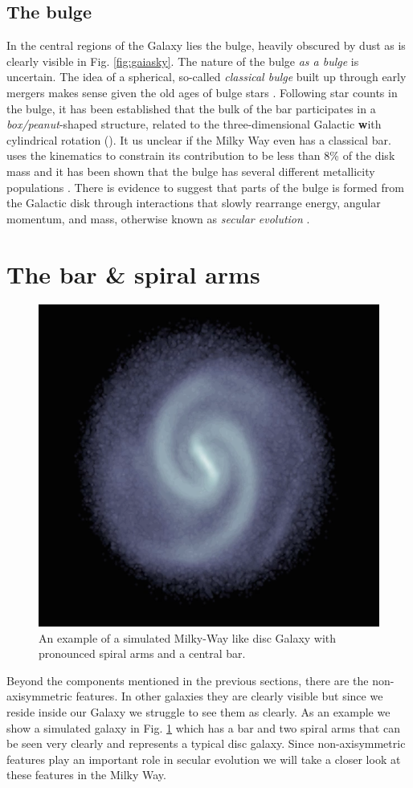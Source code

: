 \subsection{The bulge}\label{subsec:components-bulge}
In the central regions of the Galaxy lies the bulge, heavily obscured by dust as is clearly visible in Fig. \ref{fig:gaiasky}. The nature of the bulge \textit{as a bulge} is uncertain. The idea of a spherical, so-called \textit{classical bulge} built up through early mergers makes sense given the old ages of bulge stars \citep{clarkson:08}. Following star counts in the bulge, it has been established that the bulk of the bar participates in a \textit{box/peanut}-shaped structure, related to the three-dimensional Galactic \textbf with cylindrical rotation (\citealt{wegg:13, ness:13b}). It us unclear if the Milky Way even has a classical bar. \cite{shen:10} uses the kinematics to constrain its contribution to be less than 8\% of the disk mass and it has been shown that the bulge has several different metallicity populations \citep{ness:13a}. There is evidence to suggest that parts of the bulge is formed from the Galactic disk \citep{dimatteo:19} through interactions that slowly rearrange energy, angular momentum, and mass, otherwise known as \textit{secular evolution} \citep{kormendy:13}.

\section{The bar \& spiral arms}\label{sec:barspirals}
\begin{figure}[t]
    \centering
    \includegraphics[width=.65\textwidth]{images/simgal.png}
    \caption{An example of a simulated Milky-Way like disc Galaxy with pronounced spiral arms and a central bar.} %
    \label{fig:simgal}
\end{figure}
Beyond the components mentioned in the previous sections, there are the non-axisymmetric features. In other galaxies they are clearly visible but since we reside inside our Galaxy we struggle to see them as clearly. As an example we show a simulated galaxy in Fig. \ref{fig:simgal} which has a bar and two spiral arms that can be seen very clearly and represents a typical disc galaxy. Since non-axisymmetric features play an important role in secular evolution we will take a closer look at these features in the Milky Way.

